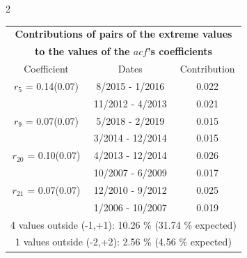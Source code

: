 
\thispagestyle{empty}
\begin{multicols}{2}{ 
\begin{tabular}{ccc}
\multicolumn{3}{c}{\textbf{Contributions of pairs of the extreme values} }  \vspace{-.10in}  \\ 
\multicolumn{3}{c}{ \textbf{to the values of the $acf$'s coefficients}} \\ 
\hline 
\hline                  Coefficient  &  Dates &  Contribution \\ 
\hline 
  $r_{ 5}$ = 0.14(0.07) &       8/2015 -  1/2016 &        0.022   \vspace{-.10in} \\  
&       11/2012 -  4/2013 &        0.021  \vspace{-.02in} \\ \hline 
  $r_{ 9}$ = 0.07(0.07) &       5/2018 -  2/2019 &        0.015   \vspace{-.10in} \\  
&        3/2014 - 12/2014 &        0.015  \vspace{-.02in} \\ \hline 
  $r_{20}$ = 0.10(0.07) &       4/2013 - 12/2014 &        0.026   \vspace{-.10in} \\  
&       10/2007 -  6/2009 &        0.017  \vspace{-.02in} \\ \hline 
  $r_{21}$ = 0.07(0.07) &      12/2010 -  9/2012 &        0.025   \vspace{-.10in} \\  
&        1/2006 - 10/2007 &        0.019  \vspace{-.02in} \\ \hline 
\multicolumn{3}{c}{               4 values outside (-1,+1): 10.26  \% (31.74  \% expected)}\vspace{-.10in} \\ 
\multicolumn{3}{c}{               1 values outside (-2,+2):  2.56 \%  (4.56 \% expected) } \\
 \end{tabular} \\ 
 } 
\end{multicols} 
